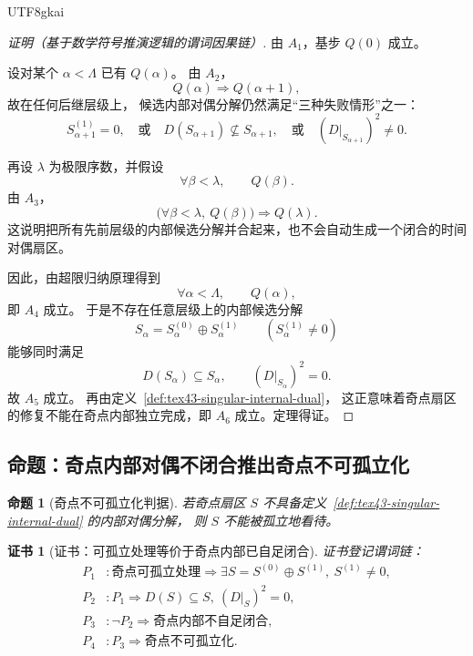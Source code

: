\documentclass[12pt]{article}
\newtheorem{proposition}{命题}[section]
\newtheorem{Certificate}{证书}[section]
\begin{document}
\begin{CJK*}{UTF8}{gkai}
\begin{proof}[证明（基于数学符号推演逻辑的谓词因果链）]
由 $A_1$，基步 $Q(0)$ 成立。

设对某个 $\alpha<\Lambda$ 已有 $Q(\alpha)$。
由 $A_2$，
\[
  Q(\alpha)\Rightarrow Q(\alpha+1),
\]
故在任何后继层级上，
候选内部对偶分解仍然满足“三种失败情形”之一：
\[
  S_{\alpha+1}^{(1)}=0,
  \quad\text{或}\quad
  D(S_{\alpha+1})\not\subseteq S_{\alpha+1},
  \quad\text{或}\quad
  (D|_{S_{\alpha+1}})^2\neq 0.
\]

再设 $\lambda$ 为极限序数，并假设
\[
  \forall \beta<\lambda,\qquad Q(\beta).
\]
由 $A_3$，
\[
  \Big(\forall \beta<\lambda,\ Q(\beta)\Big)\Rightarrow Q(\lambda).
\]
这说明把所有先前层级的内部候选分解并合起来，也不会自动生成一个闭合的时间对偶扇区。

因此，由超限归纳原理得到
\[
  \forall \alpha<\Lambda,\qquad Q(\alpha),
\]
即 $A_4$ 成立。
于是不存在任意层级上的内部候选分解
\[
  S_\alpha=S_\alpha^{(0)}\oplus S_\alpha^{(1)}
  \qquad
  (S_\alpha^{(1)}\neq 0)
\]
能够同时满足
\[
  D(S_\alpha)\subseteq S_\alpha,
  \qquad
  (D|_{S_\alpha})^2=0.
\]
故 $A_5$ 成立。
再由定义~\ref{def:tex43-singular-internal-dual}，
这正意味着奇点扇区的修复不能在奇点内部独立完成，即 $A_6$ 成立。定理得证。
\end{proof}

\subsection{命题：奇点内部对偶不闭合推出奇点不可孤立化}
\label{subsec:tex43-ch7-proposition}

\begin{proposition}[奇点不可孤立化判据]
\label{prop:tex43-singular-not-isolable}
若奇点扇区 $S$ 不具备定义~\ref{def:tex43-singular-internal-dual} 的内部对偶分解，
则 $S$ 不能被孤立地看待。
\end{proposition}

\begin{Certificate}[证书：可孤立处理等价于奇点内部已自足闭合]
\label{cert:tex43-singular-not-isolable}
证书登记谓词链：
\[
\begin{aligned}
  P_1 &: \text{奇点可孤立处理} \Rightarrow
         \exists S=S^{(0)}\oplus S^{(1)},\ S^{(1)}\neq 0,\\
  P_2 &: P_1 \Rightarrow D(S)\subseteq S,\ (D|_S)^2=0,\\
  P_3 &: \neg P_2 \Rightarrow \text{奇点内部不自足闭合},\\
  P_4 &: P_3 \Rightarrow \text{奇点不可孤立化}.
\end{aligned}
\]
\end{Certificate}


\end{CJK*}
\end{document}

